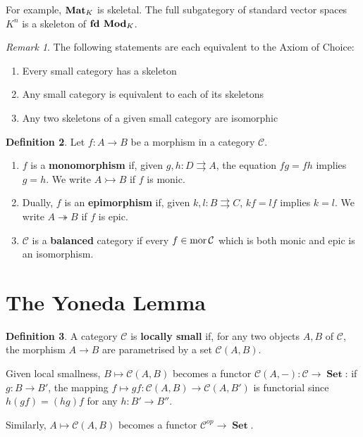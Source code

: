 \documentclass[a4paper]{article}
\theoremstyle{definition}
\newtheorem{definition}{Definition}
\theoremstyle{remark}
\newtheorem{remark}[definition]{Remark}
\theoremstyle{default}
\numberwithin{definition}{section}
\newcommand*\mor[1]{\textnormal{mor}\,#1}
\DeclareMathOperator{\Set}{\textbf{Set}}
\begin{document}
For example, $\text{\textbf{Mat}}_K$ is skeletal. The full subgategory of standard vector spaces $K^n$ is a skeleton of $\text{\textbf{fd Mod}}_K$.

\begin{remark}
	The following statements are each equivalent to the Axiom of Choice:
	\begin{enumerate}
		\item Every small category has a skeleton
		\item Any small category is equivalent to each of its skeletons
		\item Any two skeletons of a given small category are isomorphic
	\end{enumerate}
\end{remark}

\begin{definition}
	Let $f: A \to B$ be a morphism in a category $\mathcal{C}$.
	\begin{enumerate}[label=\alph*.]
		\item $f$ is a \textbf{monomorphism} if, given $g,h:D \rightrightarrows A$, the equation $fg = fh$ implies $g=h$. We write $A \rightarrowtail B$ if $f$ is monic.
		\item Dually, $f$ is an \textbf{epimorphism} if, given $k,l: B \rightrightarrows C$, $kf = lf$ implies $k=l$. We write $A \twoheadrightarrow B$ if $f$ is epic.
		\item $\mathcal{C}$ is a \textbf{balanced} category if every $f \in \mor \mathcal{C}$ which is both monic and epic is an isomorphism.
	\end{enumerate}
\end{definition}

\section{The Yoneda Lemma}
\begin{definition}
	A category $\mathcal{C}$ is \textbf{locally small} if, for any two objects $A, B$ of $\mathcal{C}$, the morphism $A \to B$ are parametrised by a set $\mathcal{C}(A, B)$.
\end{definition}

Given local smallness, $B \mapsto \mathcal{C}(A,B)$ becomes a functor $\mathcal{C}(A, -): \mathcal{C} \to \Set$: if $g: B \to B'$,
the mapping $f \mapsto gf : \mathcal{C}(A, B) \to \mathcal{C}(A, B')$ is functorial since $h(gf) = (hg)f$ for any $h: B' \to B''$.

Similarly, $A \mapsto \mathcal{C}(A, B)$ becomes a functor $\mathcal{C}^{op} \to \Set$.
\end{document}
